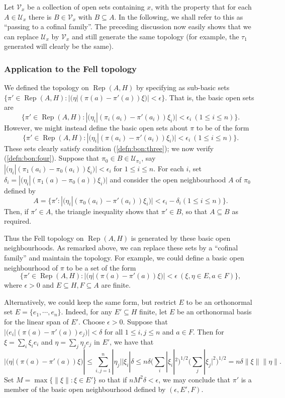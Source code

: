 \documentclass[a4paper,11pt]{article}
\newcommand{\mc}[1]{{\mathcal{#1}}}
\newcommand{\Rep}{\operatorname{Rep}}
\begin{document}
Let $\mc V_x$ be a collection of open sets containing $x$, with the
property that for each $A\in\mc U_x$ there is $B\in\mc V_x$ with $B\subseteq A$.
In the following, we shall refer to this as ``passing to a cofinal family''.
The preceding discussion now easily shows that we can replace $\mc U_x$ by
$\mc V_x$ and still generate the same topology (for example, the $\tau_1$
generated will clearly be the same).


\subsubsection{Application to the Fell topology}\label{app:app_to_fell}

We defined the topology on $\Rep(A,H)$ by specifying as sub-basic sets
$\{ \pi'\in\Rep(A,H) : |(\eta|(\pi(a)-\pi'(a))\xi)|<\epsilon \}$.  That is,
the basic open sets are
\[ \{ \pi'\in\Rep(A,H) : |(\eta_i|(\pi_i(a_i)-\pi'(a_i))\xi_i)|<\epsilon_i 
\ (1\leq i\leq n) \}. \]
However, we might instead define the basic open sets about $\pi$ to be of the
form
\[ \{ \pi'\in\Rep(A,H) : |(\eta_i|(\pi(a_i)-\pi'(a_i))\xi_i)|<\epsilon_i 
\ (1\leq i\leq n) \}. \]
These sets clearly satisfy condition (\ref{defn:bon:three}); we now verify
(\ref{defn:bon:four}).  Suppose that $\pi_0 \in B\in\mc U_{\pi_1}$, say
$|(\eta_i|(\pi_1(a_i)-\pi_0(a_i))\xi_i)|<\epsilon_i$ for $1\leq i\leq n$.  For
each $i$, set $\delta_i = |(\eta_i|(\pi_1(a)-\pi_0(a))\xi_i)|$ and consider the
open neighbourhood $A$ of $\pi_0$ defined by 
\[ A = \{\pi' : |(\eta_i|(\pi_0(a_i)-\pi'(a_i))\xi_i)|<\epsilon_i-\delta_i
(1\leq i\leq n) \}. \]
Then, if $\pi'\in A$, the triangle inequality shows that $\pi'\in B$, so that
$A\subseteq B$ as required.

Thus the Fell topology on $\Rep(A,H)$ is generated by these basic open
neighbourhoods.  As remarked above, we can replace these sets by a ``cofinal
family'' and maintain the topology.  For example, we could define a basic open
neighbourhood of $\pi$ to be a set of the form
\[ \big\{ \pi'\in\Rep(A,H) : |(\eta|(\pi(a)-\pi'(a))\xi)|<\epsilon
\ (\xi,\eta\in E,a\in F) \big\}, \]
where $\epsilon>0$ and $E\subseteq H, F\subseteq A$ are finite.

Alternatively, we could keep the same form, but restrict $E$ to be an
orthonormal set $E=\{e_1,\cdots,e_n\}$.  Indeed, for any $E'\subseteq H$ finite,
let $E$ be an orthonormal basis for the linear span of $E'$.  Choose
$\epsilon>0$.  Suppose that $|(e_i|(\pi(a)-\pi'(a))e_j)|<\delta$ for all
$1\leq i,j\leq n$ and $a\in F$.  Then for $\xi=\sum_i \xi_ie_i$ and
$\eta=\sum_j \eta_je_j$ in $E'$, we have that
\[ |(\eta|(\pi(a)-\pi'(a))\xi)| \leq
\sum_{i,j=1}^n |\eta_j| |\xi_i| \delta
\leq n\delta \Big(\sum_i |\xi_i|^2\Big)^{1/2}
\Big(\sum_j |\xi_j|^2\Big)^{1/2}
= n\delta\|\xi\|\|\eta\|. \]
Set $M=\max\{\|\xi\|:\xi\in E'\}$ so that if $n M^2 \delta < \epsilon$,
we may conclude that $\pi'$ is a member of the basic open neighbourhood defined
by $(\epsilon,E',F)$.
\end{document}
